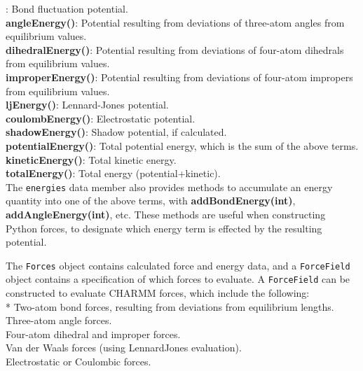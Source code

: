 \documentclass[11pt]{report}
\begin{document}
: Bond fluctuation potential.\\
{\bf angleEnergy()}: Potential resulting from deviations
of three-atom angles from equilibrium values.\\
{\bf dihedralEnergy()}: Potential resulting from deviations
of four-atom dihedrals from equilibrium values.\\
{\bf improperEnergy()}: Potential resulting from deviations
of four-atom impropers from equilibrium values.\\
{\bf ljEnergy()}: Lennard-Jones potential.\\
{\bf coulombEnergy()}: Electrostatic potential.\\
{\bf shadowEnergy()}: Shadow potential, if calculated.\\
{\bf potentialEnergy()}: Total potential energy, which is the sum
of the above terms.\\
{\bf kineticEnergy()}: Total kinetic energy.\\
{\bf totalEnergy()}: Total energy (potential+kinetic).\\


The \texttt{energies} data member also provides methods to
accumulate an energy quantity into one of the above terms,
with {\bf addBondEnergy(int)}, {\bf addAngleEnergy(int)}, etc.
These methods are useful when constructing Python forces, to
designate which energy term is effected by the resulting potential.

The \texttt{Forces} object contains calculated force and
energy data, and a \texttt{ForceField} object contains a specification
of which forces to evaluate.  A \texttt{ForceField} can
be constructed to evaluate CHARMM forces, which include
the following: \\

* Two-atom bond forces, resulting from deviations from
equilibrium lengths.\\
\indent * Three-atom angle forces.\\
\indent * Four-atom dihedral and improper forces.\\
\indent * Van der Waals forces (using LennardJones evaluation).\\
\indent * Electrostatic or Coulombic forces.\\
\end{document}
